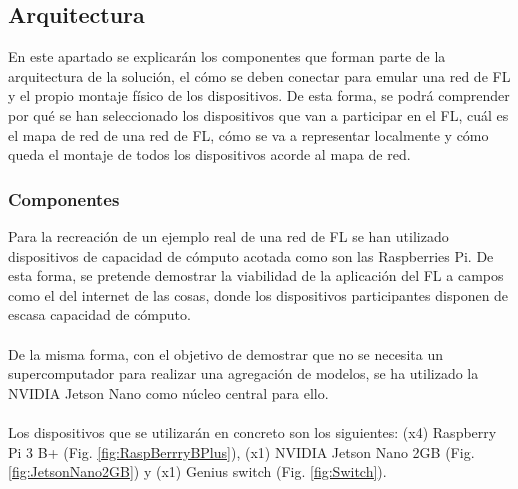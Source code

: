 \subsection{Arquitectura}
En este apartado se explicarán los componentes que forman parte de la arquitectura de la solución, el cómo se deben conectar para emular una red de FL y el propio montaje físico de los dispositivos. De esta forma, se podrá comprender por qué se han seleccionado los dispositivos que van a participar en el FL, cuál es el mapa de red de una red de FL, cómo se va a representar localmente y cómo queda el montaje de todos los dispositivos acorde al mapa de red.  

\subsubsection{Componentes}
Para la recreación de un ejemplo real de una red de FL se han utilizado dispositivos de capacidad de cómputo acotada como son las Raspberries Pi. De esta forma, se pretende demostrar la viabilidad de la aplicación del FL a campos como el del internet de las cosas, donde los dispositivos participantes disponen de escasa capacidad de cómputo.
\\ \\
De la misma forma, con el objetivo de demostrar que no se necesita un supercomputador para realizar una agregación de modelos, se ha utilizado la NVIDIA Jetson Nano como núcleo central para ello.
\\ \\
Los dispositivos que se utilizarán en concreto son los siguientes: (x4) Raspberry Pi 3 B+ (Fig. \ref{fig:RaspBerrryBPlus}), (x1) NVIDIA Jetson Nano 2GB (Fig. \ref{fig:JetsonNano2GB}) y (x1) Genius switch (Fig. \ref{fig:Switch}).

